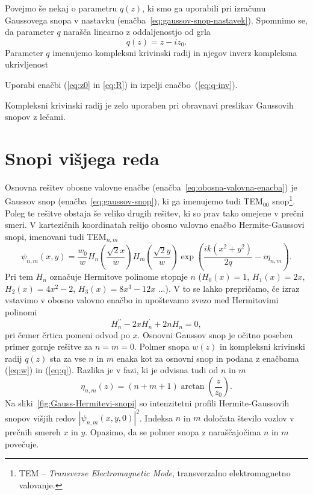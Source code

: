 Povejmo še nekaj o parametru $q(z)$, ki smo ga uporabili pri izračunu Gaussovega snopa v nastavku
(enačba~\ref{eq:gaussov-snop-nastavek}). Spomnimo 
se, da parameter $q$ narašča linearno z oddaljenostjo od grla
\begin{equation}
q(z) = z -iz_0.
\label{eq:q}
\end{equation}
Parameter $q$ imenujemo kompleksni krivinski radij in
njegov inverz kompleksna ukrivljenost
\begin{definition}
Uporabi enačbi (\ref{eq:z0} in \ref{eq:R}) in izpelji enačbo~(\ref{eq:q-inv}).
\end{definition}
Kompleksni krivinski radij je zelo uporaben pri obravnavi preslikav Gaussovih snopov z lečami.

\section{Snopi višjega reda}
Osnovna rešitev obosne valovne enačbe (enačba~\ref{eq:obosna-valovna-enacba}) 
je Gaussov snop (enačba~\ref{eq:gaussov-snop}), ki ga imenujemo tudi TEM$_{00}$ 
snop\footnote{TEM -- {\it Transverse Electromagnetic Mode}, 
transverzalno elektromagnetno valovanje.}. 
Poleg te rešitve obstaja še veliko drugih rešitev, ki so prav tako omejene v prečni smeri. 
V kartezičnih koordinatah rešijo obosno valovno enačbo
Hermite-Gaussovi snopi, imenovani tudi TEM$_{n,m}$
\begin{equation}
\psi_{n,m}(x,y)=\frac{w_{0}}{w}H_{n}\left(\frac{\sqrt{2}x}{w}\right)H_{m}\left(\frac{\sqrt{2}y}{w}\right)
\exp\left(\frac{ik(x^{2}+y^{2})}{2q}-i\eta_{n,m}\right).
\label{eq:Gauss-Hermitevi}
\end{equation}
Pri tem $H_{n}$ označuje Hermitove polinome stopnje $n$ ($H_0(x)=1$, $H_1(x)=2x$, 
$H_2(x)=4x^2-2$, $H_3(x)=8x^3-12x$ ...). 
V to se lahko
prepričamo, če izraz vstavimo v obosno valovno enačbo
in upoštevamo zvezo med Hermitovimi polinomi
\begin{equation}
H_{n}^{\prime\prime}-2xH_{n}^{\prime}+2nH_{n}=0,
\end{equation}
pri čemer črtica pomeni odvod po $x$. 
Osnovni Gaussov snop je očitno poseben primer gornje rešitve za $n=m=0$.
Polmer snopa $w(z)$ in kompleksni krivinski radij $q(z)$ sta za
vse $n$ in $m$ enaka kot za osnovni snop in podana z enačbama (\ref{eq:w})
in (\ref{eq:q}). Razlika je v fazi, ki je odvisna tudi od $n$ in $m$
\begin{equation}
\eta_{n,m}\left(z\right)=(n+m+1)\arctan\left(\frac{z}{z_{0}}\right).
\end{equation}
Na sliki~\ref{fig:Gauss-Hermitevi-snopi} so intenzitetni profili 
Hermite-Gaussovih snopov višjih redov $|\psi_{n,m}(x, y, 0)|^2$.
Indeksa $n$ in $m$ določata število vozlov v prečnih smereh $x$ in $y$. Opazimo, da se polmer snopa z 
naraščajočima $n$ in $m$ povečuje.

